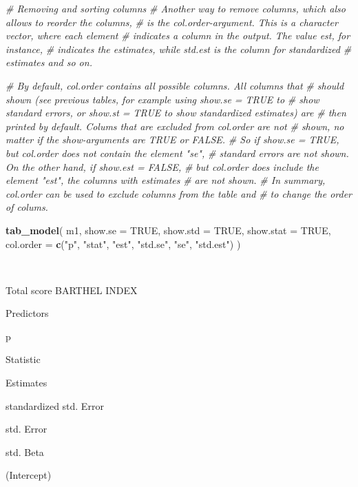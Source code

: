 \documentclass[]{article}
\newenvironment{Shaded}{\begin{snugshade}}{\end{snugshade}}
\newcommand{\KeywordTok}[1]{\textcolor[rgb]{0.13,0.29,0.53}{\textbf{#1}}}
\newcommand{\DataTypeTok}[1]{\textcolor[rgb]{0.13,0.29,0.53}{#1}}
\newcommand{\StringTok}[1]{\textcolor[rgb]{0.31,0.60,0.02}{#1}}
\newcommand{\CommentTok}[1]{\textcolor[rgb]{0.56,0.35,0.01}{\textit{#1}}}
\newcommand{\OtherTok}[1]{\textcolor[rgb]{0.56,0.35,0.01}{#1}}
\newcommand{\NormalTok}[1]{#1}
\begin{document}
\begin{Shaded}
\begin{Highlighting}[]
\CommentTok{# Removing and sorting columns}
\CommentTok{# Another way to remove columns, which also allows to reorder the columns, }
\CommentTok{# is the col.order-argument. This is a character vector, where each element}
\CommentTok{# indicates a column in the output. The value est, for instance, }
\CommentTok{# indicates the estimates, while std.est is the column for standardized}
\CommentTok{# estimates and so on.}

\CommentTok{# By default, col.order contains all possible columns. All columns that}
\CommentTok{# should shown (see previous tables, for example using show.se = TRUE to }
\CommentTok{# show standard errors, or show.st = TRUE to show standardized estimates) are }
\CommentTok{# then printed by default. Colums that are excluded from col.order are not }
\CommentTok{# shown, no matter if the show-arguments are TRUE or FALSE. }
\CommentTok{# So if show.se = TRUE, but col.order does not contain the element "se", }
\CommentTok{# standard errors are not shown. On the other hand, if show.est = FALSE,}
\CommentTok{# but col.order does include the element "est", the columns with estimates }
\CommentTok{# are not shown.}
\CommentTok{# In summary, col.order can be used to exclude columns from the table and }
\CommentTok{# to change the order of colums.}


\KeywordTok{tab_model}\NormalTok{(}
\NormalTok{  m1, }\DataTypeTok{show.se =} \OtherTok{TRUE}\NormalTok{, }\DataTypeTok{show.std =} \OtherTok{TRUE}\NormalTok{, }\DataTypeTok{show.stat =} \OtherTok{TRUE}\NormalTok{,}
  \DataTypeTok{col.order =} \KeywordTok{c}\NormalTok{(}\StringTok{"p"}\NormalTok{, }\StringTok{"stat"}\NormalTok{, }\StringTok{"est"}\NormalTok{, }\StringTok{"std.se"}\NormalTok{, }\StringTok{"se"}\NormalTok{, }\StringTok{"std.est"}\NormalTok{)}
\NormalTok{)}
\end{Highlighting}
\end{Shaded}

~

Total score BARTHEL INDEX

Predictors

p

Statistic

Estimates

standardized std. Error

std. Error

std. Beta

(Intercept)
\end{document}
